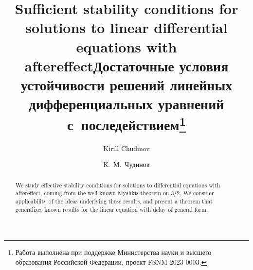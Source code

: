 \begin{englishtitle} %
\title{Sufficient stability conditions for solutions to linear differential equations with aftereffect}
\author{Kirill Chudinov
}

\maketitle

\begin{abstract}
We study effective stability conditions for solutions to differential equations with aftereffect, coming from the well-known Myshkis theorem on $3/2$.
We consider applicability of the ideas underlying these results, and present a theorem that generalizes known results for the linear equation with delay of general form.

\end{abstract}
\end{englishtitle}


\iffalse
\documentclass[12pt]{llncs}


\usepackage{iftex}

\ifPDFTeX
\usepackage[T2A]{fontenc}
\usepackage[utf8]{inputenc} %
\usepackage[english,russian]{babel}
\fi

\usepackage{todonotes}

\usepackage[russian]{nla}



\fi

\title{Достаточные условия устойчивости решений линейных дифференциальных уравнений с~последействием\thanks{Работа выполнена при поддержке Министерства науки и высшего образования Российской Федерации, проект FSNM-2023-0003.}}
\author{К.~М.~Чудинов
} %


